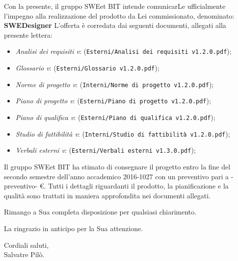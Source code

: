 \vspace{5mm}Con la presente, il gruppo SWEet BIT intende comunicarLe ufficialmente l'impegno
	alla realizzazione del prodotto da Lei commissionato, denominato: {\textbf{SWEDesigner}} \newline
	L'offerta è corredata dai seguenti documenti, allegati alla presente lettera:
	\begin{itemize}
		\item \emph{Analisi dei requisiti v\VersioneAR{}}: (\verb|Esterni/Analisi dei requisiti v1.2.0.pdf|);
		\item \emph{Glossario v\VersioneG{}}: (\verb|Esterni/Glossario v1.2.0.pdf|);
		\item \emph{Norme di progetto v\VersioneNP{}}: (\verb|Interni/Norme di progetto v1.2.0.pdf|);
		\item \emph{Piano di progetto v\VersionePP{}}: (\verb|Esterni/Piano di progetto v1.2.0.pdf|);
		\item \emph{Piano di qualifica v\VersionePQ{}}: (\verb|Esterni/Piano di qualifica v1.2.0.pdf|);
		\item \emph{Studio di fattibilità v\VersioneSF{}}: (\verb|Interni/Studio di fattibilità v1.2.0.pdf|);
		\item \emph{Verbali esterni v\VersioneVE{}}: (\verb|Esterni/Verbali esterni v1.3.0.pdf|);
	\end{itemize}
	Il gruppo SWEet BIT ha stimato di consegnare il progetto entro la fine del secondo semestre dell'anno accademico 2016-1027
	con un preventivo pari a -preventivo- \euro .
	Tutti i dettagli riguardanti il prodotto, la pianificazione e la qualità sono trattati in maniera approfondita
	nei documenti allegati.
	\begin{flushleft}
	\vspace{2cm}
		Rimango a Sua completa disposizione per qualsiasi chiarimento.
	\end{flushleft}
	\begin{flushleft}
		La ringrazio in anticipo per la Sua attenzione.
	\end{flushleft}
	\vspace{5mm}
	\begin{center}
		Cordiali saluti,\\
		\vspace{1cm}Salvatre Pilò.
	\end{center}
